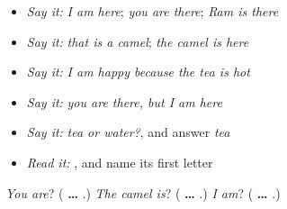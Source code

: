 \begin{itemize}
\raggedright
  \item \emph{Say it:} \emph{I am here}; \emph{you are there}; \emph{Ram is there}
  \item \emph{Say it:} \emph{that is a camel}; \emph{the camel is here}
  \item \emph{Say it:} \emph{I am happy because the tea is hot}
  \item \emph{Say it:} \emph{you are there, but I am here}
  \item \emph{Say it:} \emph{tea or water?}, and answer \emph{tea}
  \item \emph{Read it:} \textbf{}, and name its first letter
\end{itemize}

\begin{tcolorbox}[breakable,colback=teal!4,colframe=teal!35!black,title={Before you move on}]
\emph{You are}? (\textbf{ … }.) \emph{The camel is}? (\textbf{ … }.) \emph{I am}? (\textbf{ … }.)
\end{tcolorbox}
